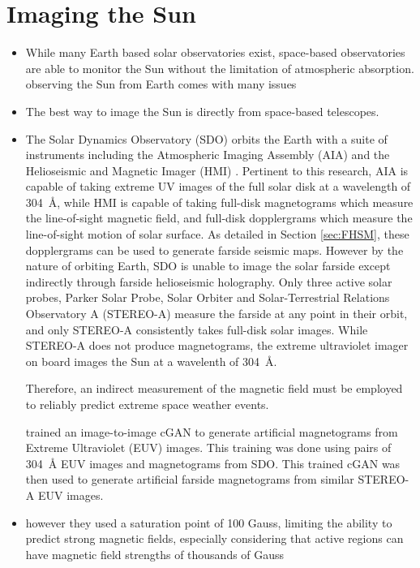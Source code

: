 \documentclass[11pt,a4paper,onecolumn]{report}
\begin{document}
\section{Imaging the Sun}
\begin{itemize}
  \item While many Earth based solar observatories exist, space-based
  observatories are able to monitor the Sun without the limitation of
  atmospheric absorption.
  observing the Sun from
  Earth comes with many issues 
  \item The best way to image the Sun is directly from space-based telescopes.
  \item The Solar Dynamics Observatory (SDO) \citep{pesnell_solar_2012} orbits
  the Earth with a suite of instruments including the Atmospheric Imaging
  Assembly (AIA) \citep{lemen_atmospheric_2012} and the Helioseismic and
  Magnetic Imager (HMI) \citep{scherrer_helioseismic_2012}. Pertinent to this
  research, AIA is capable of taking extreme UV images of the full solar disk at
  a wavelength of \SI{304}{\angstrom}, while HMI is capable of taking full-disk
  magnetograms which measure the line-of-sight magnetic field, and full-disk
  dopplergrams which measure the line-of-sight motion of solar surface. As
  detailed in Section \ref{sec:FHSM}, these dopplergrams can be used to generate
  farside seismic maps. However by the nature of orbiting Earth, SDO is unable
  to image the solar farside except indirectly through farside helioseismic
  holography. Only three active solar probes, Parker Solar Probe, Solar Orbiter
  and Solar-Terrestrial Relations Observatory A (STEREO-A) measure the farside
  at any point in their orbit, and only STEREO-A consistently takes full-disk
  solar images. While STEREO-A does not produce magnetograms, the extreme
  ultraviolet imager on board images the Sun at a wavelenth of
  \SI{304}{\angstrom}. 

  Therefore, an indirect
  measurement of the magnetic field must be employed to reliably predict extreme
  space weather events.
  
  \citet{Kim2019} trained an image-to-image cGAN to generate artificial
  magnetograms from Extreme Ultraviolet (EUV) images. This training was done
  using pairs of \SI{304}{\angstrom} EUV images and magnetograms from SDO. This
  trained cGAN was then used to generate artificial farside magnetograms from
  similar STEREO-A EUV images.

  \item however they used a saturation point of 100 Gauss, limiting the ability
  to predict strong magnetic fields, especially considering that active regions
  can have magnetic field strengths of thousands of Gauss


\end{itemize}
\end{document}
